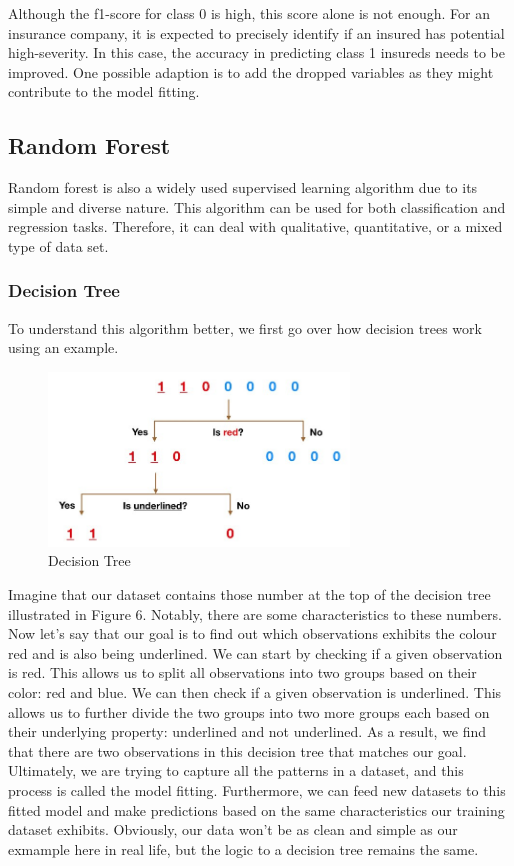 \documentclass[12pt]{article} %
\theoremstyle{definition}
\begin{document}
\vspace{\baselineskip}
Although the f1-score for class 0 is high, this score alone is not enough. For an insurance company, it is expected to precisely identify if an insured has potential high-severity. In this case, the accuracy in predicting class 1 insureds needs to be improved. One possible adaption is to add the dropped variables as they might contribute to the model fitting.

\newpage
\subsection{Random Forest}
Random forest is also a widely used supervised learning algorithm due to its simple and diverse nature. This algorithm can be used for both classification and regression tasks. Therefore, it can deal with qualitative, quantitative, or a mixed type of data set.

\subsubsection{Decision Tree}
To understand this algorithm better, we first go over how decision trees work using an example.\cite{RandomForest}

\begin{figure}[H]
    \centering
    \includegraphics[width=8cm]{p1.png}
    \caption{Decision Tree}
    \label{fig:my_label}
\end{figure}

Imagine that our dataset contains those number at the top of the decision tree illustrated in Figure 6. Notably, there are some characteristics to these numbers. Now let’s say that our goal is to find out which observations exhibits the colour red and is also being underlined. We can start by checking if a given observation is red. This allows us to split all observations into two groups based on their color: red and blue. We can then check if a given observation is underlined. This allows us to further divide the two groups into two more groups each based on their underlying property: underlined and not underlined. As a result, we find that there are two observations in this decision tree that matches our goal. Ultimately, we are trying to capture all the patterns in a dataset, and this process is called the model fitting. Furthermore, we can feed new datasets to this fitted model and make predictions based on the same characteristics our training dataset exhibits. Obviously, our data won’t be as clean and simple as our exmample here in real life, but the logic to a decision tree remains the same. 
\end{document}
